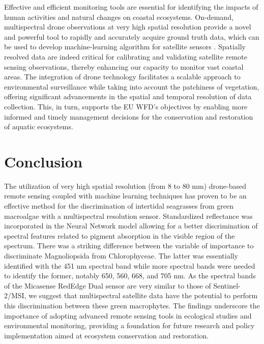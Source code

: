 \documentclass[
  number]{elsarticle}
\begin{document}
Effective and efficient monitoring tools are essential for identifying
the impacts of human activities and natural changes on coastal
ecosystems. On-demand, multispectral drone observations at very high
spatial resolution provide a novel and powerful tool to rapidly and
accurately acquire ground truth data, which can be used to develop
machine-learning algorithm for satellite sensors
\citep{davies2024intertidal}. Spatially resolved data are indeed
critical for calibrating and validating satellite remote sensing
observations, thereby enhancing our capacity to monitor vast coastal
areas. The integration of drone technology facilitates a scalable
approach to environmental surveillance while taking into account the
patchiness of vegetation, offering significant advancements in the
spatial and temporal resolution of data collection. This, in turn,
supports the EU WFD's objectives by enabling more informed and timely
management decisions for the conservation and restoration of aquatic
ecosystems.

\section{Conclusion}\label{conclusion}

The utilization of very high spatial resolution (from 8 to 80 mm)
drone-based remote sensing coupled with machine learning techniques has
proven to be an effective method for the discrimination of intertidal
seagrasses from green macroalgae with a multispectral resolution sensor.
Standardized reflectance was incorporated in the Neural Network model
allowing for a better discrimination of spectral features related to
pigment absorption in the visible region of the spectrum. There was a
striking difference between the variable of importance to discriminate
Magnoliopsida from Chlorophyceae. The latter was essentially identified
with the 451 nm spectral band while more spectral bands were needed to
identify the former, notably 650, 560, 668, and 705 nm. As the spectral
bands of the Micasense RedEdge Dual sensor are very similar to those of
Sentinel-2/MSI, we suggest that multispectral satellite data have the
potential to perform this discrimination between these green
macrophytes. The findings underscore the importance of adopting advanced
remote sensing tools in ecological studies and environmental monitoring,
providing a foundation for future research and policy implementation
aimed at ecosystem conservation and restoration.


  
\end{document}
